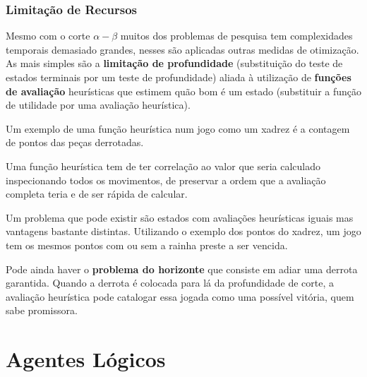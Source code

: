 \documentclass[]{report}
\begin{document}
\subsection{Limitação de Recursos}
Mesmo com o corte $\alpha-\beta$ muitos dos problemas de pesquisa tem complexidades temporais demasiado grandes, nesses são aplicadas outras medidas de otimização. As mais simples são a \textbf{limitação de profundidade} (substituição do teste de estados terminais por um teste de profundidade) aliada à utilização de \textbf{funções de avaliação} heurísticas que estimem quão bom é um estado (substituir a função de utilidade por uma avaliação heurística).\par
Um exemplo de uma função heurística num jogo como um xadrez é a contagem de pontos das peças derrotadas.\par
Uma função heurística tem de ter correlação ao valor que seria calculado inspecionando todos os movimentos, de preservar a ordem que a avaliação completa teria e de ser rápida de calcular.\par
Um problema que pode existir são estados com avaliações heurísticas iguais mas vantagens bastante distintas. Utilizando o exemplo dos pontos do xadrez, um jogo tem os mesmos pontos com ou sem a rainha preste a ser vencida.\par
Pode ainda haver o \textbf{problema do horizonte} que consiste em adiar uma derrota garantida. Quando a derrota é colocada para lá da profundidade de corte, a avaliação heurística pode catalogar essa jogada como uma possível vitória, quem sabe promissora.
\chapter{Agentes Lógicos}
\end{document}
